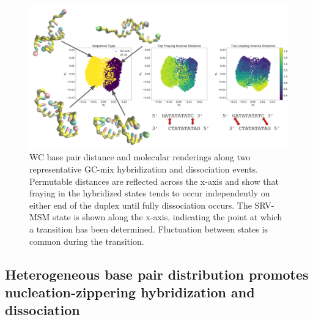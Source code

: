 \documentclass[journal=jpcbfk,manuscript=article]{achemso}
\begin{document}

\begin{figure} %
	\begin{center}
	\includegraphics[width=150mm, scale=1]{Fig7.pdf}
        \caption{WC base pair distance and molecular renderings along two representative GC-mix hybridization and dissociation events. Permutable distances are reflected across the x-axis and show that fraying in the hybridized states tends to occur independently on either end of the duplex until fully dissociation occurs. The SRV-MSM state is shown along the x-axis, indicating the point at which a transition has been determined. Fluctuation between states is common during the transition.}
        \label{fig:GC-mix_transitions}
	\end{center}
\end{figure}

\subsection{Heterogeneous base pair distribution promotes nucleation-zippering hybridization and dissociation}
\end{document}

